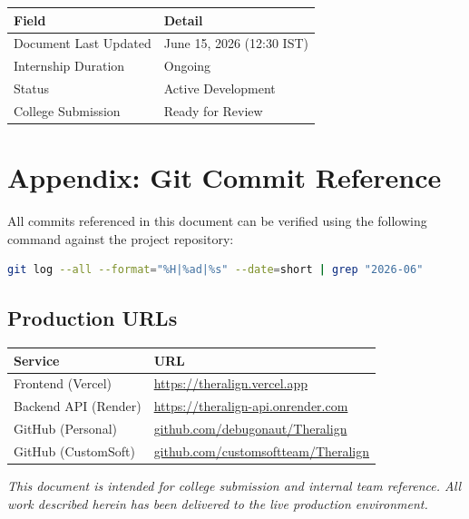 \documentclass[11pt,a4paper]{article}
\begin{document}
\begin{table}[h!]
\centering
\begin{tabularx}{\textwidth}{l X}
\toprule
\textbf{Field} & \textbf{Detail} \\
\midrule
Document Last Updated & June 15, 2026 (12:30 IST) \\
Internship Duration   & Ongoing \\
Status                & Active Development \\
College Submission    & Ready for Review \\
\bottomrule
\end{tabularx}
\end{table}

\newpage

\section{Appendix: Git Commit Reference}

All commits referenced in this document can be verified using the following command
against the project repository:

\begin{lstlisting}[language=bash, caption=Command used to verify all commit entries]
git log --all --format="%H|%ad|%s" --date=short | grep "2026-06"
\end{lstlisting}

\subsection*{Production URLs}

\begin{table}[h!]
\centering
\begin{tabularx}{\textwidth}{l X}
\toprule
\textbf{Service} & \textbf{URL} \\
\midrule
Frontend (Vercel)       & \href{https://theralign.vercel.app}{https://theralign.vercel.app} \\
Backend API (Render)    & \href{https://theralign-api.onrender.com}{https://theralign-api.onrender.com} \\
GitHub (Personal)       & \href{https://github.com/debugonaut/Theralign}{github.com/debugonaut/Theralign} \\
GitHub (CustomSoft)     & \href{https://github.com/customsoftteam/Theralign}{github.com/customsoftteam/Theralign} \\
\bottomrule
\end{tabularx}
\end{table}

\vspace{2em}
\noindent\textit{This document is intended for college submission and internal team reference.
All work described herein has been delivered to the live production environment.}
\end{document}
